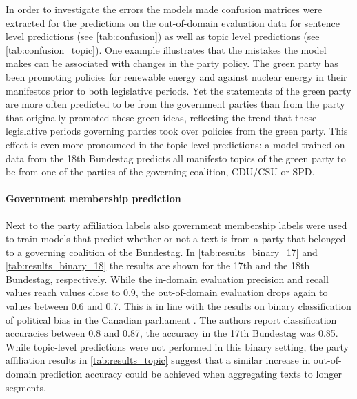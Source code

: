 \documentclass{article}
\begin{document}
In order to investigate the errors the models made confusion matrices were extracted for the predictions on the out-of-domain evaluation data for sentence level predictions (see \autoref{tab:confusion}) as well as topic level predictions (see \autoref{tab:confusion_topic}). One example illustrates that the mistakes the model makes can be associated with changes in the party policy. The green party has been promoting policies for renewable energy and against nuclear energy in their manifestos prior to both legislative periods. Yet the statements of the green party are more often predicted to be from the government parties than from the party that originally promoted these green ideas, reflecting the trend that these legislative periods governing parties took over policies from the green party. This effect is even more pronounced in the topic level predictions: a model trained on data from the 18th Bundestag predicts all manifesto topics of the green party to be from one of the parties of the governing coalition, CDU/CSU or SPD. \\

\paragraph{Government membership prediction} Next to the party affiliation labels also government membership labels were used to train models that predict whether or not a text is from a party that belonged to a governing coalition of the Bundestag. In \autoref{tab:results_binary_17} and \autoref{tab:results_binary_18} the results are shown for the 17th and the 18th Bundestag, respectively. While the in-domain evaluation precision and recall values reach values close to 0.9, the out-of-domain evaluation drops again to values between 0.6 and 0.7. This is in line with the results on binary classification of political bias in the Canadian parliament \cite{Yu2008}. The authors report classification accuracies between 0.8 and 0.87, the accuracy in the 17th Bundestag was 0.85. While topic-level predictions were not performed in this binary setting, the party affiliation results in \autoref{tab:results_topic} suggest that a similar increase in out-of-domain prediction accuracy could be achieved when aggregating texts to longer segments. 
\end{document}
